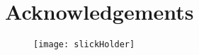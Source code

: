 %
\chapter*{Acknowledgements}
\label{sec:acknowledgement}
\vspace*{-10mm}

\bigskip
\bigskip
\bigskip

\begin{figure}[H]%
	\centering%
	\texttt{[image: slickHolder]}%
\end{figure}%

